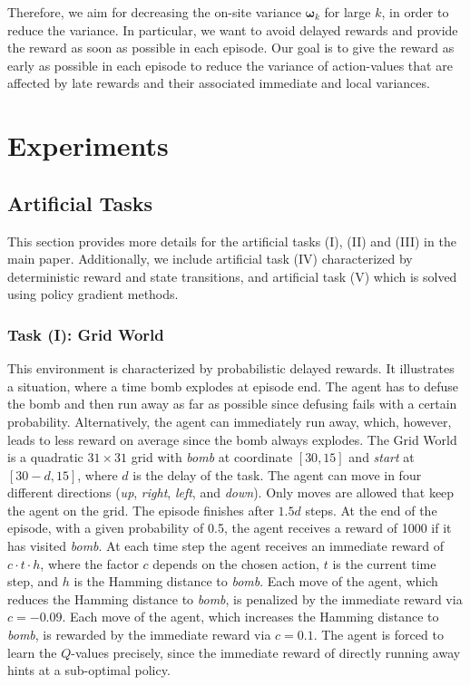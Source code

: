 \documentclass{article}
\newcommand\Bom{\bm{\omega}}
\begin{document}
\begin{appendices}
Therefore, we aim for decreasing the on-site variance $\Bom_k$ for large $k$, in order to
reduce the variance.
In particular, we want to avoid delayed rewards and provide the reward
as soon as possible in each episode.
Our goal is to give the reward as early as possible in each episode to reduce the
variance of action-values that are affected by late rewards and
their associated immediate and local variances.



\pagebreak
\section{Experiments}

\subsection{Artificial Tasks}
\label{sec:Aexp}
This section provides more details for the artificial tasks (I), (II) and (III) in the main paper. Additionally, we include artificial task (IV) characterized by deterministic reward and state transitions, and artificial task (V) which is solved using policy gradient methods.


\subsubsection{Task (I): Grid World}
\label{sec:AGW}
This environment is characterized by probabilistic delayed rewards.
It illustrates a situation, where a time bomb
explodes at episode end.
The agent has to defuse the bomb
and then run away as far as possible since
defusing fails with a certain probability.
Alternatively, the agent can immediately run away, 
which, however, leads to less reward on average 
since the bomb always explodes.
The Grid World is a quadratic $31\times 31$ grid with
{\em bomb} at coordinate $[30,15]$ and
{\em start} at $[30-d, 15]$, where $d$ is the delay of the task.
The agent can move in four different directions 
({\em up}, {\em right}, {\em left}, and {\em down}).
Only moves are allowed that keep the agent on the grid. 
The episode finishes after $1.5 d$ steps.
At the end of the episode, 
with a given probability of 0.5, the agent receives a reward of 1000
if it has visited {\em bomb}.
At each time step the agent receives 
an immediate reward of $c\cdot t \cdot h$, 
where the factor $c$ depends on the chosen action, 
$t$ is the current time step, and $h$ is the Hamming distance to {\em bomb}.
Each move of the agent, which reduces the Hamming distance to {\em bomb}, 
is penalized by the immediate reward via $c=-0.09$. 
Each move of the agent, which increases the Hamming distance to {\em bomb}, 
is rewarded by the immediate reward via $c=0.1$.
The agent is forced to learn the $Q$-values precisely,
since the immediate reward of directly running away hints at a sub-optimal policy.


\end{appendices}
\end{document}
